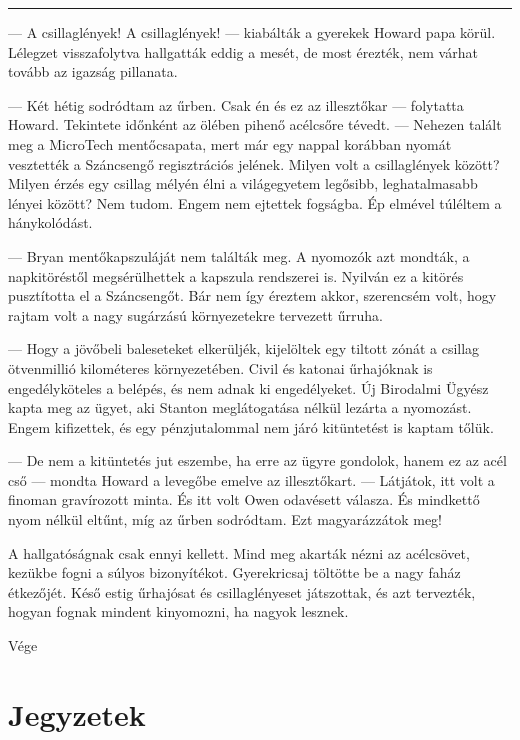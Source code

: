 \documentclass[10pt]{memoir}
\renewcommand{\pfbreakdisplay}{\bigskip \ding{70} \bigskip}
\newcommand{\secbreak}{\fancybreak{\pfbreakdisplay}}
\begin{document}
\secbreak
\begin{itshape}

--- A csillaglények! A csillaglények! --- kiabálták a gyerekek Howard papa
körül. Lélegzet visszafolytva hallgatták eddig a mesét, de most érezték, nem
várhat tovább az igazság pillanata.

--- Két hétig sodródtam az űrben. Csak én és ez az illesztőkar --- folytatta
Howard. Tekintete időnként az ölében pihenő acélcsőre tévedt. --- Nehezen
talált meg a MicroTech mentőcsapata, mert már egy nappal korábban nyomát
vesztették a Száncsengő regisztrációs jelének. Milyen volt a csillaglények
között? Milyen érzés egy csillag mélyén élni a világegyetem legősibb,
leghatalmasabb lényei között? Nem tudom. Engem nem ejtettek fogságba. Ép
elmével túléltem a hánykolódást.

--- Bryan mentőkapszuláját nem találták meg. A nyomozók azt mondták, a
napkitöréstől megsérülhettek a kapszula rendszerei is. Nyilván ez a kitörés
pusztította el a Száncsengőt. Bár nem így éreztem akkor, szerencsém volt, hogy
rajtam volt a nagy sugárzású környezetekre tervezett űrruha.

--- Hogy a jövőbeli baleseteket elkerüljék, kijelöltek egy tiltott zónát a
csillag ötvenmillió kilométeres környezetében. Civil és katonai űrhajóknak is
engedélyköteles a belépés, és nem adnak ki engedélyeket. Új Birodalmi Ügyész
kapta meg az ügyet, aki Stanton meglátogatása nélkül lezárta a nyomozást. Engem
kifizettek, és egy pénzjutalommal nem járó kitüntetést is kaptam tőlük.

--- De nem a kitüntetés jut eszembe, ha erre az ügyre gondolok, hanem ez az
acél cső --- mondta Howard a levegőbe emelve az illesztőkart. --- Látjátok, itt
volt a finoman gravírozott minta. És itt volt Owen odavésett válasza. És
mindkettő nyom nélkül eltűnt, míg az űrben sodródtam. Ezt magyarázzátok meg!

A hallgatóságnak csak ennyi kellett. Mind meg akarták nézni az acélcsövet,
kezükbe fogni a súlyos bizonyítékot. Gyerekricsaj töltötte be a nagy faház
étkezőjét. Késő estig űrhajósat és csillaglényeset játszottak, és azt
tervezték, hogyan fognak mindent kinyomozni, ha nagyok lesznek.

\end{itshape}

\begin{center}
Vége
\end{center}

\chapter*{Jegyzetek}
\end{document}
